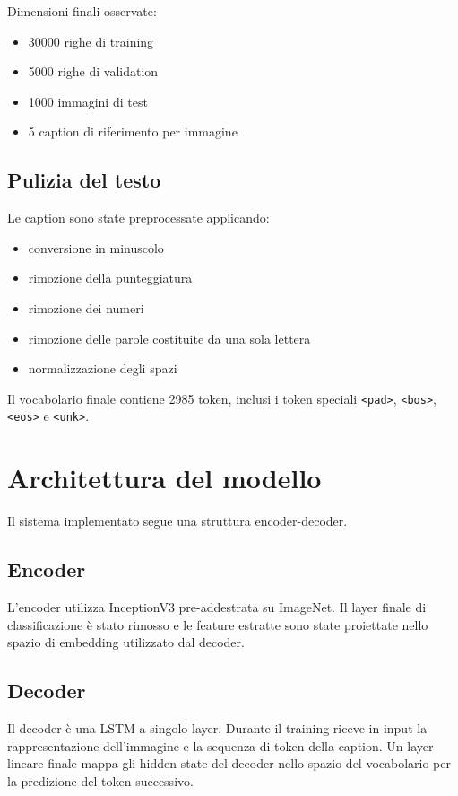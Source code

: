 \documentclass[11pt,a4paper]{article}
\begin{document}
Dimensioni finali osservate:
\begin{itemize}[leftmargin=*]
    \item 30000 righe di training
    \item 5000 righe di validation
    \item 1000 immagini di test
    \item 5 caption di riferimento per immagine
\end{itemize}

\subsection{Pulizia del testo}

Le caption sono state preprocessate applicando:
\begin{itemize}[leftmargin=*]
    \item conversione in minuscolo
    \item rimozione della punteggiatura
    \item rimozione dei numeri
    \item rimozione delle parole costituite da una sola lettera
    \item normalizzazione degli spazi
\end{itemize}

Il vocabolario finale contiene 2985 token, inclusi i token speciali \texttt{<pad>}, \texttt{<bos>}, \texttt{<eos>} e \texttt{<unk>}.

\section{Architettura del modello}

Il sistema implementato segue una struttura encoder-decoder.

\subsection{Encoder}

L'encoder utilizza InceptionV3 pre-addestrata su ImageNet. Il layer finale di classificazione è stato rimosso e le feature estratte sono state proiettate nello spazio di embedding utilizzato dal decoder.

\subsection{Decoder}

Il decoder è una LSTM a singolo layer. Durante il training riceve in input la rappresentazione dell'immagine e la sequenza di token della caption. Un layer lineare finale mappa gli hidden state del decoder nello spazio del vocabolario per la predizione del token successivo.
\end{document}
